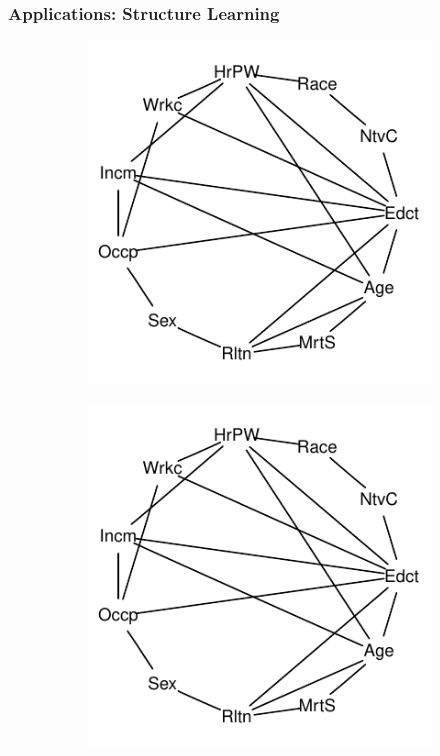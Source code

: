 \documentclass{beamer}
\begin{document}
\begin{frame}
	\frametitle{Applications: Structure Learning}
	\begin{figure}
		\centering
		\begin{subfigure}{0.33\textwidth}
			\centering
			\includegraphics{imgs/sl-adult-rf.pdf}
			\caption*{}
		\end{subfigure}%
		\begin{subfigure}{0.33\textwidth}
			\centering
			\includegraphics[scale=0.85]{imgs/sl-adult-rf.pdf}
			\caption*{}
			\label{fig:sl_adult_model}
		\end{subfigure}%
		\begin{subfigure}{0.33\textwidth}
			\centering

\end{subfigure}
\end{figure}
\end{frame}
\end{document}
